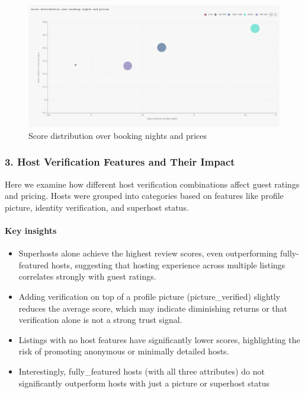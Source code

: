 \vspace{1em}
\begin{figure}[H]
    \centering
    \includegraphics[width=1\textwidth]{images/q2_2.jpg}
    \caption{Score distribution over booking nights and prices}\label{fig:figureq4}
\end{figure}

\subsubsection*{3. Host Verification Features and Their Impact}

Here we examine how different host verification combinations affect guest ratings and pricing. Hosts were grouped into categories based on features like profile picture, identity verification, and superhost status.

\vspace{0.5em}
\paragraph{Key insights}
\begin{itemize}
    \item Superhosts alone achieve the highest review scores, even outperforming fully-featured hosts, suggesting that hosting experience across multiple listings correlates strongly with guest ratings.
    \item Adding verification on top of a profile picture (picture\_verified) slightly reduces the average score, which may indicate diminishing returns or that verification alone is not a strong trust signal.
    \item Listings with no host features have significantly lower scores, highlighting the risk of promoting anonymous or minimally detailed hosts.
    \item Interestingly, fully\_featured hosts (with all three attributes) do not significantly outperform hosts with just a picture or superhost status
\end{itemize}

